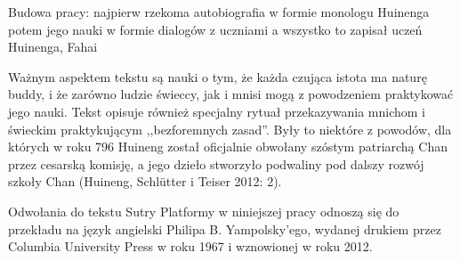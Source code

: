 Budowa pracy: najpierw rzekoma autobiografia w formie monologu Huinenga
potem jego nauki w formie dialogów z uczniami
a wszystko to zapisał uczeń Huinenga, Fahai
\fi

Ważnym aspektem tekstu są nauki o tym, że każda czująca istota ma naturę buddy, i że zarówno ludzie świeccy, jak i mnisi mogą z powodzeniem praktykować jego nauki. Tekst opisuje również specjalny rytuał przekazywania mnichom i świeckim praktykującym ,,bezforemnych zasad''. %
Były to niektóre z powodów, dla których w roku 796 Huineng został oficjalnie obwołany szóstym patriarchą Chan przez cesarską komisję, a jego dzieło stworzyło podwaliny pod dalszy rozwój szkoły Chan (Huineng, Schlütter i Teiser 2012: 2).

Odwołania do tekstu Sutry Platformy w niniejszej pracy odnoszą się do przekładu na język angielski Philipa B. Yampolsky'ego, wydanej drukiem przez Columbia University Press w roku 1967 i wznowionej w roku 2012.
